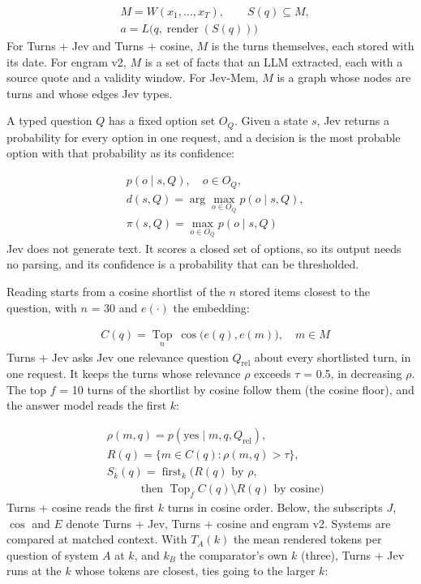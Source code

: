 \documentclass[11pt]{article}
\newcommand{\src}[1]{}
\begin{document}
\begin{align}
& M = W(x_1, \ldots, x_T), \qquad S(q) \subseteq M, \nonumber\\
& a = L\bigl(q, \operatorname{render}(S(q))\bigr) \label{eq:memory}
\end{align}
For Turns + Jev and Turns + cosine, $M$ is the turns themselves, each stored with its date. For engram v2, $M$ is a set of facts that an LLM extracted, each with a source quote and a validity window. For Jev-Mem, $M$ is a graph whose nodes are turns and whose edges Jev types.

A typed question $Q$ has a fixed option set $O_Q$. Given a state $s$, Jev returns a probability for every option in one request, and a decision is the most probable option with that probability as its confidence:

\begin{align}
& p(o \mid s, Q), \quad o \in O_Q, \nonumber\\
& d(s, Q) = \arg\max_{o \in O_Q} p(o \mid s, Q), \nonumber\\
& \pi(s, Q) = \max_{o \in O_Q} p(o \mid s, Q) \label{eq:jev}
\end{align}
Jev does not generate text. It scores a closed set of options, so its output needs no parsing, and its confidence is a probability that can be thresholded.

Reading starts from a cosine shortlist of the $n$ stored items closest to the question, with $n$ = 30\src{docs/V3\_PLAN.md §1, §2, §4} and $e(\cdot)$ the embedding:

\begin{align}
& C(q) = \operatorname*{Top}_{n}\ \cos\bigl(e(q), e(m)\bigr), \quad m \in M \label{eq:shortlist}
\end{align}
Turns + Jev asks Jev one relevance question $Q_{\text{rel}}$ about every shortlisted turn, in one request. It keeps the turns whose relevance $\rho$ exceeds $\tau$ = 0.5\src{docs/V3\_PLAN.md §1, §2, §4}, in decreasing $\rho$. The top $f$ = 10\src{docs/V3\_PLAN.md §1, §2, §4} turns of the shortlist by cosine follow them (the cosine floor), and the answer model reads the first $k$:

\begin{align}
& \rho(m, q) = p(\text{yes} \mid m, q, Q_{\text{rel}}), \nonumber\\
& R(q) = \{m \in C(q) : \rho(m, q) > \tau\}, \nonumber\\
& S_k(q) = \operatorname{first}_k\bigl(R(q) \text{ by } \rho, \nonumber\\
& \qquad\quad \text{then } \operatorname{Top}_f C(q) \setminus R(q) \text{ by cosine}\bigr) \label{eq:select}
\end{align}
Turns + cosine reads the first $k$ turns in cosine order. Below, the subscripts $J$, $\cos$ and $E$ denote Turns + Jev, Turns + cosine and engram v2. Systems are compared at matched context. With $T_A(k)$ the mean rendered tokens per question of system $A$ at $k$, and $k_B$ the comparator's own $k$ (three), Turns + Jev runs at the $k$ whose tokens are closest, ties going to the larger $k$:
\end{document}
